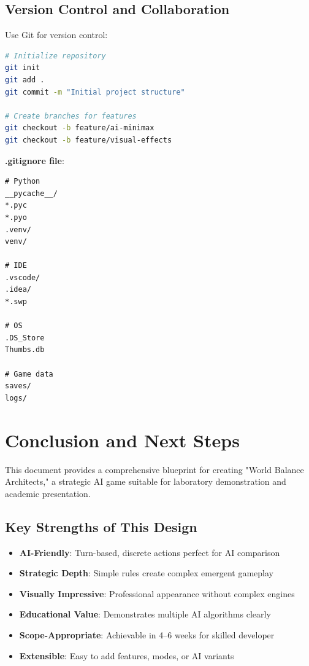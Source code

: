\documentclass[12pt,a4paper]{article}
\begin{document}
\subsection{Version Control and Collaboration}

Use Git for version control:

\begin{lstlisting}[language=bash]
# Initialize repository
git init
git add .
git commit -m "Initial project structure"

# Create branches for features
git checkout -b feature/ai-minimax
git checkout -b feature/visual-effects
\end{lstlisting}

\textbf{.gitignore file}:
\begin{lstlisting}
# Python
__pycache__/
*.pyc
*.pyo
.venv/
venv/

# IDE
.vscode/
.idea/
*.swp

# OS
.DS_Store
Thumbs.db

# Game data
saves/
logs/
\end{lstlisting}

\section{Conclusion and Next Steps}

This document provides a comprehensive blueprint for creating "World Balance Architects," a strategic AI game suitable for laboratory demonstration and academic presentation.

\subsection{Key Strengths of This Design}

\begin{itemize}
    \item \textbf{AI-Friendly}: Turn-based, discrete actions perfect for AI comparison
    \item \textbf{Strategic Depth}: Simple rules create complex emergent gameplay
    \item \textbf{Visually Impressive}: Professional appearance without complex engines
    \item \textbf{Educational Value}: Demonstrates multiple AI algorithms clearly
    \item \textbf{Scope-Appropriate}: Achievable in 4--6 weeks for skilled developer
    \item \textbf{Extensible}: Easy to add features, modes, or AI variants
\end{itemize}
\end{document}
